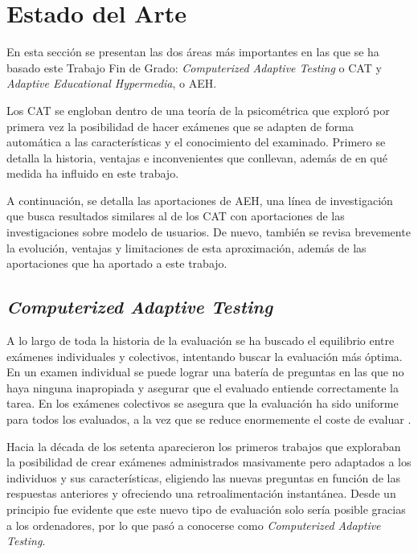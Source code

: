 \chapter{Estado del Arte\label{sec:estado_del_arte}}

En esta sección se presentan las dos áreas más importantes en las que se ha basado este Trabajo Fin de Grado: \textit{Computerized Adaptive Testing} o \acrshort{CAT} y \textit{Adaptive Educational Hypermedia}, o \acrshort{AEH}.

Los \acrshort{CAT} se engloban dentro de una teoría de la psicométrica que exploró por primera vez la posibilidad de hacer exámenes que se adapten de forma automática a las características y el conocimiento del examinado. Primero se detalla la historia, ventajas e inconvenientes que conllevan, además de en qué medida ha influido en este trabajo. 

A continuación, se detalla las aportaciones de \acrshort{AEH}, una línea de investigación que busca resultados similares al de los \acrshort{CAT} con aportaciones de las investigaciones sobre modelo de usuarios. De nuevo, también se revisa brevemente la evolución, ventajas y limitaciones de esta aproximación, además de las aportaciones que ha aportado a este trabajo.

\section{\textit{Computerized Adaptive Testing}}

A lo largo de toda la historia de la evaluación se ha buscado el equilibrio entre exámenes individuales y colectivos, intentando buscar la evaluación más óptima. En un examen individual se puede lograr una batería de preguntas en las que no haya ninguna inapropiada y asegurar que el evaluado entiende correctamente la tarea. En los exámenes colectivos se asegura que la evaluación ha sido uniforme para todos los evaluados, a la vez que se reduce enormemente el coste de evaluar \cite{Wainer00}.

Hacia la década de los setenta aparecieron los primeros trabajos que exploraban la posibilidad de crear exámenes administrados masivamente pero adaptados a los individuos y sus características, eligiendo las nuevas preguntas en función de las respuestas anteriores y ofreciendo una retroalimentación instantánea\cite{Lord68}. Desde un principio fue evidente que este nuevo tipo de evaluación solo sería posible gracias a los ordenadores, por lo que pasó a conocerse como \textit{Computerized Adaptive Testing}.

